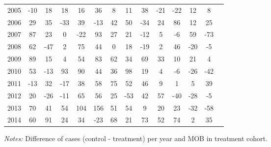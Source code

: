 \begin{table}[H]
\begin{threeparttable}
{\begin{tabular}{l*{13}{c}}
2005        &         -10&          18&          18&          16&          36&           8&          11&          38&         -21&         -22&          12&           8\\
2006        &          29&          35&         -33&          39&         -13&          42&          50&         -34&          24&          86&          12&          25\\
2007        &          87&          23&           0&         -22&          93&          27&          21&         -12&           5&          -6&          59&         -73\\
2008        &          62&         -47&           2&          75&          44&           0&          18&         -19&           2&          46&         -20&          -5\\
2009        &          89&          15&           4&          54&          83&          62&          34&          69&          33&          10&          21&           4\\
2010        &          53&         -13&          93&          90&          44&          36&          98&          19&           4&          -6&         -26&         -42\\
2011        &         -13&          32&         -17&          38&          58&          75&          52&          46&           9&           1&           5&          39\\
2012        &          20&         -26&         -11&          65&          56&          25&         -53&          42&          57&         -40&         -28&          -5\\
2013        &          70&          41&          54&         104&         156&          51&          54&           9&          20&          23&         -32&         -58\\
2014        &          60&          91&          24&          34&         -23&          68&          21&          73&          52&          74&           2&          35\\
 \bottomrule \end{tabular} } \begin{tablenotes} \item \scriptsize \emph{Notes:} Difference of cases (control - treatment) per year and MOB in treatment cohort. \end{tablenotes} \end{threeparttable} \end{table} 
